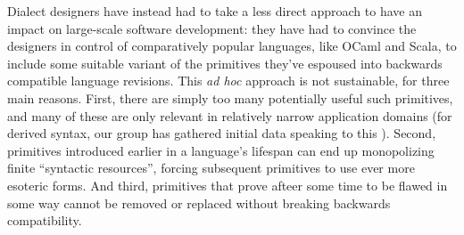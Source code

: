 Dialect designers have instead had to take a less direct approach to have an impact on large-scale software development: they have had to convince the designers in control of comparatively popular languages, like OCaml and Scala, to include some suitable variant of the primitives they've espoused into backwards compatible language revisions. %
This \emph{ad hoc} approach is not sustainable, for three main reasons. First,  there are simply too  many potentially useful such primitives, and many of these are only relevant in relatively narrow application domains (for derived syntax, our group has  gathered initial data speaking to this \cite{TSLs}). Second, primitives introduced earlier in a language's lifespan can end up monopolizing finite ``syntactic resources'', forcing subsequent primitives to use ever more esoteric forms. And third, primitives that prove afteer some time to be flawed in some way cannot be removed or replaced without breaking backwards compatibility. %

